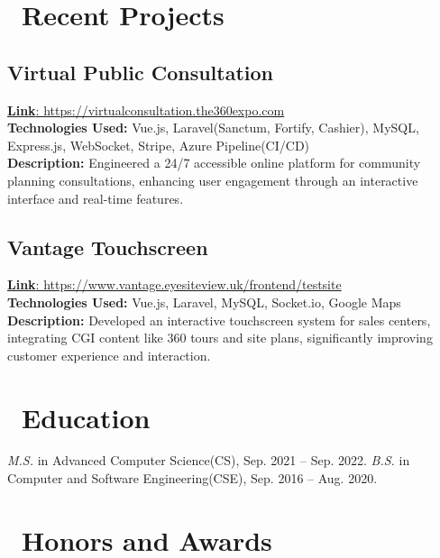 \documentclass{resume}
\begin{document}
\section{\faServer\ Recent Projects}
\subsection*{\textbf{Virtual Public Consultation}}
\href{https://virtualconsultation.the360expo.com}{\textbf{Link}: https://virtualconsultation.the360expo.com}  \\
\textbf{Technologies Used:} Vue.js, Laravel(Sanctum, Fortify, Cashier), MySQL, Express.js, WebSocket, Stripe, Azure Pipeline(CI/CD) \\
\textbf{Description:} Engineered a 24/7 accessible online platform for community planning consultations, enhancing user engagement through an interactive interface and real-time features.

\subsection*{\textbf{Vantage Touchscreen}}
\href{https://www.vantage.eyesiteview.uk/frontend/testsite}{\textbf{Link}: https://www.vantage.eyesiteview.uk/frontend/testsite}  \\
\textbf{Technologies Used:} Vue.js, Laravel, MySQL, Socket.io, Google Maps \\
\textbf{Description:} Developed an interactive touchscreen system for sales centers, integrating CGI content like 360 tours and site plans, significantly improving customer experience and interaction.



\section{\faGraduationCap\ Education}
\textit{M.S.} in Advanced Computer Science(CS), Sep. 2021 -- Sep. 2022.
\textit{B.S.} in Computer and Software Engineering(CSE), Sep. 2016 -- Aug. 2020.



\section{\faHeartO\ Honors and Awards}
\end{document}
